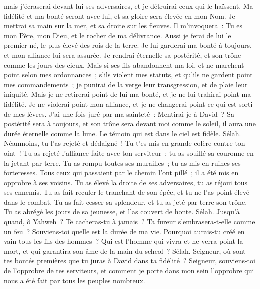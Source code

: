 \begin{multicols}{2}
mais j'écraserai devant lui ses adversaires, et je détruirai ceux qui le haïssent.
Ma fidélité et ma bonté seront avec lui, et sa gloire sera élevée en mon Nom.
Je mettrai sa main sur la mer, et sa droite sur les fleuves.
Il m'invoquera~: Tu es mon Père, mon Dieu, et le rocher de ma délivrance.
Aussi je ferai de lui le premier-né, le plus élevé des rois de la terre.
Je lui garderai ma bonté à toujours, et mon alliance lui sera assurée.
Je rendrai éternelle sa postérité, et son trône comme les jours des cieux.
Mais si ses fils abandonnent ma loi, et ne marchent point selon mes ordonnances~;
s'ils violent mes statuts, et qu'ils ne gardent point mes commandements~;
je punirai de la verge leur transgression, et de plaie leur iniquité.
Mais je ne retirerai point de lui ma bonté, et je ne lui trahirai point ma fidélité.
Je ne violerai point mon alliance, et je ne changerai point ce qui est sorti de mes lèvres.
J'ai une fois juré par ma sainteté~: Mentirai-je à David~?
Sa postérité sera à toujours, et son trône sera devant moi comme le soleil,
il aura une durée éternelle comme la lune. Le témoin qui est dans le ciel est fidèle. Sélah.
Néanmoins, tu l'as rejeté et dédaigné~! Tu t'es mis en grande colère contre ton oint~!
Tu as rejeté l'alliance faite avec ton serviteur~; tu as souillé sa couronne en la jetant par terre.
Tu as rompu toutes ses murailles~; tu as mis en ruines ses forteresses.
Tous ceux qui passaient par le chemin l'ont pillé~; il a été mis en opprobre à ses voisins.
Tu as élevé la droite de ses adversaires, tu as réjoui tous ses ennemis.
Tu as fait reculer le tranchant de son épée, et tu ne l'as point élevé dans le combat.
Tu as fait cesser sa splendeur, et tu as jeté par terre son trône.
Tu as abrégé les jours de sa jeunesse, et l'as couvert de honte. Sélah.
Jusqu'à quand, ô Yahweh~? Te cacheras-tu à jamais~? Ta fureur s'embrasera-t-elle comme un feu~?
Souviens-toi quelle est la durée de ma vie. Pourquoi aurais-tu créé en vain tous les fils des hommes~?
Qui est l'homme qui vivra et ne verra point la mort, et qui garantira son âme de la main du scheol~? Sélah.
Seigneur, où sont tes bontés premières que tu juras à David dans ta fidélité~?
Seigneur, souviens-toi de l'opprobre de tes serviteurs, et comment je porte dans mon sein l'opprobre qui nous a été fait par tous les peuples nombreux.

\end{multicols}
